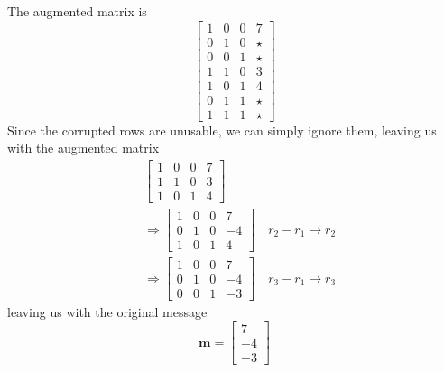 \documentclass[]{article}
\begin{document}
The augmented matrix is
\begin{equation}
	\left[
	\begin{array}{ccc|c}
	1 & 0 & 0 & 7 \\
	0 & 1 & 0 & \star \\
	0 & 0 & 1 & \star \\
	1 & 1 & 0 & 3 \\
	1 & 0 & 1 & 4 \\
	0 & 1 & 1 & \star \\
	1 & 1 & 1 & \star
	\end{array}
	\right]
\end{equation}
Since the corrupted rows are unusable, we can simply ignore them, leaving us with the augmented matrix
\begin{align}
	&\left[
	\begin{array}{ccc|c}
	1 & 0 & 0 & 7 \\
	1 & 1 & 0 & 3 \\
	1 & 0 & 1 & 4
	\end{array}
	\right] \\
	&\Rightarrow \left[
	\begin{array}{ccc|c}
	1 & 0 & 0 & 7 \\
	0 & 1 & 0 & -4 \\
	1 & 0 & 1 & 4
	\end{array}
	\right] \quad r_2 - r_1 \to r_2 \\
	&\Rightarrow \left[
	\begin{array}{ccc|c}
	1 & 0 & 0 & 7 \\
	0 & 1 & 0 & -4 \\
	0 & 0 & 1 & -3
	\end{array}
	\right] \quad r_3 - r_1 \to r_3
\end{align}
leaving us with the original message
\begin{equation}
	\mathbf{m} = 
	\begin{bmatrix}
	7 \\
	-4 \\
	-3
	\end{bmatrix}
\end{equation}

\subsection{}
\end{document}
